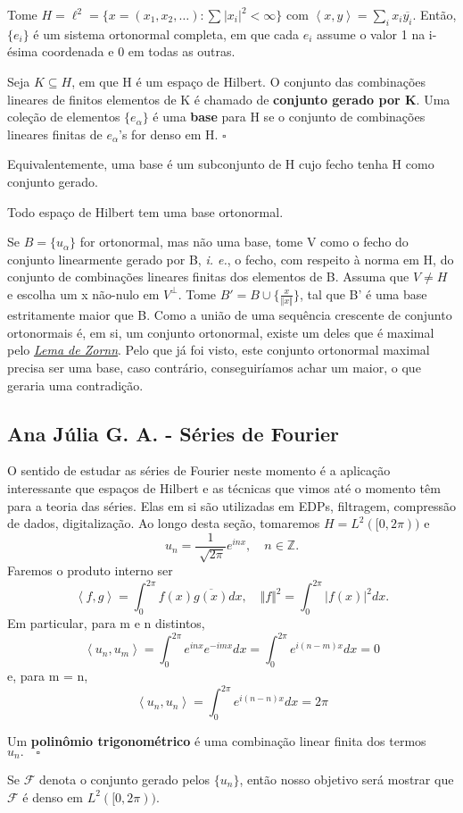 \documentclass[measure_theory.tex]{subfiles}
\begin{document}
\begin{example}
	Tome \(H = \ell ^{2} = \{x = (x_1, x_2, \dotsc ): \sum\limits_{}^{}|x_{i}|^{2} < \infty\}\) com \(\left< x, y \right> = \sum\limits_{i}^{}x_{i}\overline{y_{i}}\). Então, \(\{e_{i}\}\) é um sistema ortonormal completa, em que cada \(e_{i}\) assume o valor 1 na i-ésima coordenada
	e 0 em todas as outras.
\end{example}
\begin{def*}
	Seja \(K\subseteq H\), em que H é um espaço de Hilbert. O conjunto das combinações lineares de finitos elementos de K é chamado de \textbf{conjunto gerado por K}.
	Uma coleção de elementos \(\{e_{\alpha }\}\) é uma \textbf{base} para H se o conjunto de combinações lineares finitas de \(e_{\alpha }\)'s for denso em H. \(\square\)
\end{def*}
Equivalentemente, uma base é um subconjunto de H cujo fecho tenha H como conjunto gerado.
\begin{prop*}
	Todo espaço de Hilbert tem uma base ortonormal.
\end{prop*}
\begin{proof*}
	Se \(B = \{u_{\alpha }\} \) for ortonormal, mas não uma base, tome V como o fecho do conjunto linearmente gerado por B, \textit{i. e.}, o fecho, com respeito à norma em H, do conjunto de combinações lineares finitas dos elementos de B.
	Assuma que \(V\neq H\) e escolha um x não-nulo em \(V^{\perp }.\) Tome \(B' = B \cup \biggl\{\frac{x}{\Vert x \Vert}\biggr\}\), tal que B' é uma base estritamente maior que B.
	Como a união de uma sequência crescente de conjunto ortonormais é, em si, um conjunto ortonormal, existe um deles que é maximal pelo \hyperlink{zornn}{\textit{Lema de Zornn}}. Pelo que já foi visto, este conjunto ortonormal maximal precisa ser uma base,
	caso contrário, conseguiríamos achar um maior, o que geraria uma contradição. \qedsymbol
\end{proof*}

\subsection{Ana Júlia G. A. - Séries de Fourier}
O sentido de estudar as séries de Fourier neste momento é a aplicação interessante que espaços de Hilbert e as técnicas que vimos até o momento têm para a teoria das séries. Elas em si são utilizadas em EDPs, filtragem, compressão de dados,
digitalização. Ao longo desta seção, tomaremos \(H = L^{2}([0, 2\pi ))\) e
\[
	u_{n} = \frac{1}{\sqrt[]{2\pi }}e^{inx},\quad n\in \mathbb{Z}.
\]
Faremos o produto interno ser
\[
	\left< f, g \right> = \int_{0}^{2\pi }f(x)\overline{g(x)}dx,\quad \Vert f \Vert^{2} = \int_{0}^{2\pi }|f(x)|^{2}dx.
\]
Em particular, para m e n distintos,
\[
	\left< u_{n}, u_{m} \right> = \int_{0}^{2\pi }e^{inx}e^{-imx}dx = \int_{0}^{2\pi }e^{i(n-m)x}dx = 0
\]
e, para m = n,
\[
	\left< u_{n}, u_{n} \right> = \int_{0}^{2\pi }e^{i(n-n)x}dx = 2\pi
\]
\begin{def*}
	Um \textbf{polinômio trigonométrico} é uma combinação linear finita dos termos \(u_{n}.\quad \square\)
\end{def*}
Se \(\mathcal{F}\) denota o conjunto gerado pelos \(\{u_{n}\}\), então nosso objetivo será mostrar que \(\mathcal{F}\) é denso em \(L^{2}([0, 2\pi )).\)
\end{document}
